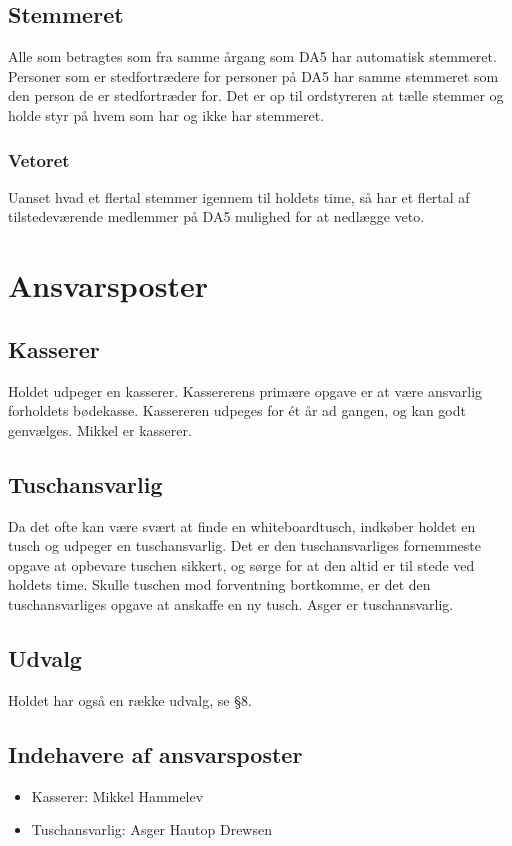 \documentclass{article}
\let\OldS\S
\renewcommand{\S}{\OldS{}}
\begin{document}
	\subsection{Stemmeret}
	Alle som betragtes som fra samme årgang som DA5 har automatisk stemmeret. Personer som er stedfortrædere for personer på DA5 har samme stemmeret som den person de er stedfortræder for. Det er op til ordstyreren at tælle stemmer og holde styr på hvem som har og ikke har stemmeret.
	\subsubsection{Vetoret}
	Uanset hvad et flertal stemmer igennem til holdets time, så har et flertal af tilstedeværende medlemmer på DA5 mulighed for at nedlægge veto.
	
	\section{Ansvarsposter}
	\subsection{Kasserer}
	Holdet udpeger en kasserer. Kassererens primære opgave er at være ansvarlig forholdets bødekasse. Kassereren udpeges for ét år ad gangen, og kan godt genvælges. Mikkel er kasserer.
	\subsection{Tuschansvarlig}
	Da det ofte kan være svært at finde en whiteboardtusch, indkøber holdet en tusch og udpeger en tuschansvarlig. Det er den tuschansvarliges fornemmeste opgave at opbevare tuschen sikkert, og sørge for at den altid er til stede ved holdets time. Skulle 
	tuschen mod forventning bortkomme, er det den tuschansvarliges opgave at anskaffe en 
	ny tusch. Asger er tuschansvarlig.
	\subsection{Udvalg}
	Holdet har også en række udvalg, se \S8.
	\subsection{Indehavere af ansvarsposter}
	\begin{itemize}
		\item Kasserer: Mikkel Hammelev
		\item Tuschansvarlig: Asger Hautop Drewsen
	\end{itemize}
	
\end{document}
